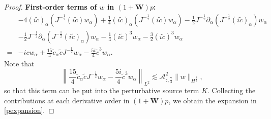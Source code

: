 \documentclass[10pt,a4paper]{amsart}
\newcommand{\ASSharp}{{\mathcal{A}_{\sharp,\frac{7}{4}}^2}}
\newcommand{\al}{\alpha}
\newcommand{\bw}{\mathbf{W}}
\newcommand{\f}{\frac}
\newcommand{\p}{\partial}
\begin{document}
\begin{proof}
{\bf{First-order terms of $w$ in $(1+\mathbf{W})p$:}}
\begin{align*}
&-4(i\tilde{c})_{\al}(J^{-\f12}(i\tilde{c})w_{\al})+\f14(i\tilde{c})_{\al}(J^{-\f12}(i\tilde{c})w_{\al}) -\f12J^{-\f12}\p_{\al}(J^{-\f12}(i\tilde{c})_{\al})w_{\al}
\\
&-\f12J^{-\f12}\p_{\al}(J^{-\f12}(i\tilde{c})_{\al})w_{\al}
-\f14(i\tilde{c})^3w_{\al}-\f32(i\tilde{c})^3w_{\al}\\
=&-icw_{\al}+\f{15}{4}\tilde{c}_{\al}\tilde{c}J^{-\f12}w_{\al}-\f{5i}{4}\tilde{c}^3w_{\al}.
\end{align*}
Note that 
\begin{equation*}
 \left\|\f{15}{4}\tilde{c}_{\al}\tilde{c}J^{-\f12}w_{\al}-\f{5i}{4}\tilde{c}^3w_{\al} \right\|_{L^2} \lesssim \ASSharp \| w\|_{H^\f32} ,
\end{equation*}
so that this term can be put into the perturbative source term $K$.
Collecting the contributions at each derivative order in $(1+\bw)p$, we obtain the expansion in \eqref{pexpansion}. 
\end{proof}
\end{document}
